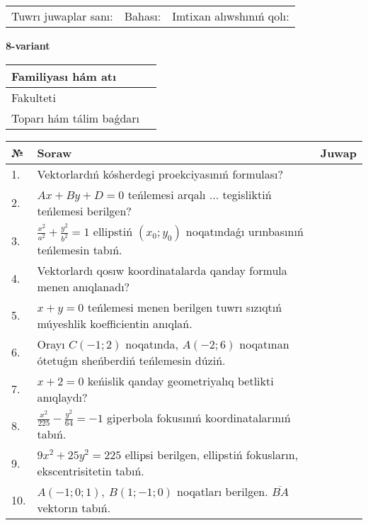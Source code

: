 \documentclass{article}
\begin{document}
\vspace{1cm}

\begin{tabular}{lll}
Tuwrı juwaplar sanı: \underline{\hspace{1.5cm}} & 
Bahası: \underline{\hspace{1.5cm}} & 
Imtixan alıwshınıń qolı: \underline{\hspace{2cm}} \\
\end{tabular}

\egroup

\newpage


\textbf{8-variant}\\

\bgroup
\def\arraystretch{1.6} %

\begin{tabular}{|m{5.7cm}|m{9.5cm}|}
\hline
Familiyası hám atı & \\
\hline
Fakulteti  & \\
\hline
Toparı hám tálim baǵdarı  & \\
\hline
\end{tabular}

\vspace{1cm}

\begin{tabular}{|m{0.7cm}|m{10cm}|m{4cm}|}
\hline
№ & Soraw & Juwap \\
\hline
1. & Vektorlardıń kósherdegi proekciyasınıń formulası? &  \\
\hline
2. & $Ax+By+D=0$ teńlemesi arqalı ... tegisliktiń teńlemesi berilgen? &  \\
\hline
3. & $\frac{x^2}{a^2}+\frac{y^2}{b^2}=1$ ellipstiń $(x_0;y_0)$ noqatındaǵı urınbasınıń teńlemesin tabıń. &  \\
\hline
4. & Vektorlardı qosıw koordinatalarda qanday formula menen anıqlanadı? &  \\
\hline
5. & $x+y=0$ teńlemesi menen berilgen tuwrı sızıqtıń múyeshlik koefficientin anıqlań. &  \\
\hline
6. & Orayı $C (-1;2)$ noqatında, $A (-2;6 )$ noqatınan ótetuǵın sheńberdiń teńlemesin dúziń. &  \\
\hline
7. & $x+2=0$ keńislik qanday geometriyalıq betlikti anıqlaydı? &  \\
\hline
8. & $\frac{x^{2}}{225}-\frac{y^{2}}{64}=-1$ giperbola fokusınıń koordinatalarınıń tabıń. &  \\
\hline
9. & $9x^{2}+25y^{2}=225$ ellipsi berilgen, ellipstiń fokusların, ekscentrisitetin tabıń. &  \\
\hline
10. & $A (-1;0;1),\ B (1;-1;0)$ noqatları berilgen. $\overline{BA}$ vektorın tabıń. &  \\
\hline
\end{tabular}
\end{document}
